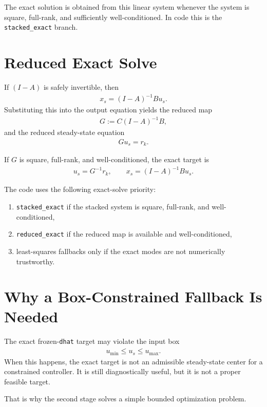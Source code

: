 \documentclass[11pt]{article}
\begin{document}
The exact solution is obtained from this linear system whenever the system is square, full-rank, and sufficiently well-conditioned. In code this is the \texttt{stacked\_exact} branch.

\section{Reduced Exact Solve}

If $(I-A)$ is safely invertible, then
\begin{align}
x_s = (I-A)^{-1} B u_s.
\end{align}
Substituting this into the output equation yields the reduced map
\begin{align}
G := C(I-A)^{-1}B,
\end{align}
and the reduced steady-state equation
\begin{align}
G u_s = r_k.
\end{align}

If $G$ is square, full-rank, and well-conditioned, the exact target is
\begin{align}
u_s = G^{-1} r_k, \qquad
x_s = (I-A)^{-1} B u_s.
\end{align}

The code uses the following exact-solve priority:
\begin{enumerate}
\item \texttt{stacked\_exact} if the stacked system is square, full-rank, and well-conditioned,
\item \texttt{reduced\_exact} if the reduced map is available and well-conditioned,
\item least-squares fallbacks only if the exact modes are not numerically trustworthy.
\end{enumerate}

\section{Why a Box-Constrained Fallback Is Needed}

The exact frozen-\texttt{dhat} target may violate the input box
\begin{align}
u_{\min} \le u_s \le u_{\max}.
\end{align}
When this happens, the exact target is not an admissible steady-state center for a constrained controller. It is still diagnostically useful, but it is not a proper feasible target.

That is why the second stage solves a simple bounded optimization problem.
\end{document}
